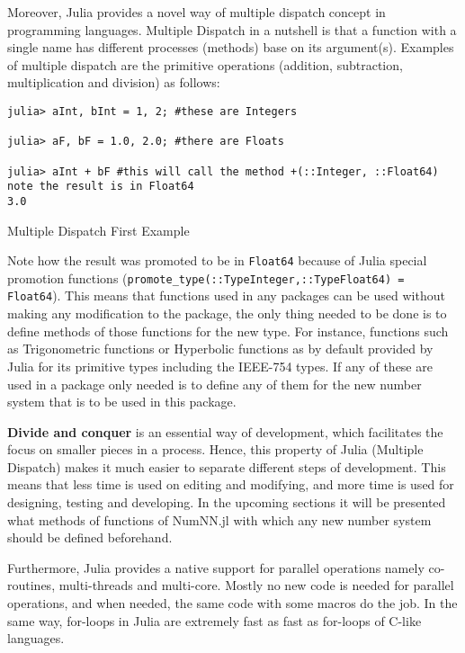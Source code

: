 Moreover, Julia provides a novel way of multiple dispatch\cite{WikiMultipleDispatch} concept in programming languages\cite{JuliaMehtods}. Multiple Dispatch in a nutshell is that a function with a single name has different processes (methods) base on its argument(s). Examples of multiple dispatch are the primitive operations (addition, subtraction, multiplication and division) as follows:

\begin{listing}[H]
\begin{verbatim}
julia> aInt, bInt = 1, 2; #these are Integers

julia> aF, bF = 1.0, 2.0; #there are Floats

julia> aInt + bF #this will call the method +(::Integer, ::Float64) note the result is in Float64
3.0
\end{verbatim}
\caption{Multiple Dispatch First Example}
\end{listing}

Note how the result was promoted to be in \texttt{Float64} because of Julia special promotion functions (\texttt{promote_type(::Type{Integer},::Type{Float64}) = Float64}). This means that functions used in any packages can be used without making any modification to the package, the only thing needed to be done is to define methods of those functions for the new type. For instance, functions such as Trigonometric functions or Hyperbolic functions as by default provided by Julia for its primitive types including the IEEE-754 types. If any of these are used in a package only needed is to define any of them for the new number system that is to be used in this package.

\textbf{Divide and conquer} is an essential way of development, which facilitates the focus on smaller pieces in a process. Hence, this property of Julia (Multiple Dispatch) makes it much easier to separate different steps of development. This means that less time is used on editing and modifying, and more time is used for designing, testing and developing. In the upcoming sections it will be presented what methods of functions of NumNN.jl with which any new number system should be defined beforehand.

Furthermore, Julia provides a native support for parallel operations namely co-routines, multi-threads and multi-core. Mostly no new code is needed for parallel operations, and when needed, the same code with some macros do the job. In the same way, for-loops in Julia are extremely fast as fast as for-loops of C-like languages. 
